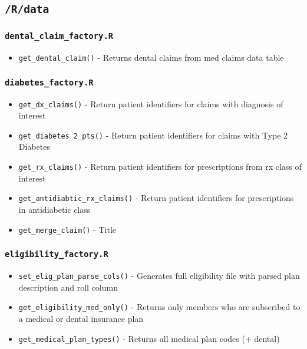 \documentclass[
]{book}
\providecommand{\tightlist}{%
  \setlength{\itemsep}{0pt}\setlength{\parskip}{0pt}}
\begin{document}
\hypertarget{rdata}{%
\subsection{\texorpdfstring{\texttt{/R/data}}{/R/data}}\label{rdata}}

\hypertarget{dental_claim_factory.r}{%
\subsubsection{\texorpdfstring{\texttt{dental\_claim\_factory.R}}{dental\_claim\_factory.R}}\label{dental_claim_factory.r}}

\begin{itemize}
\tightlist
\item
  \texttt{get\_dental\_claim()} - Returns dental claims from med claims data table
\end{itemize}

\hypertarget{diabetes_factory.r}{%
\subsubsection{\texorpdfstring{\texttt{diabetes\_factory.R}}{diabetes\_factory.R}}\label{diabetes_factory.r}}

\begin{itemize}
\tightlist
\item
  \texttt{get\_dx\_claims()} - Return patient identifiers for claims with diagnosis of interest
\item
  \texttt{get\_diabetes\_2\_pts()} - Return patient identifiers for claims with Type 2 Diabetes
\item
  \texttt{get\_rx\_claims()} - Return patient identifiers for prescriptions from rx class of interest
\item
  \texttt{get\_antidiabtic\_rx\_claims()} - Return patient identifiers for prescriptions in antidiabetic class
\item
  \texttt{get\_merge\_claim()} - Title
\end{itemize}

\hypertarget{eligibility_factory.r}{%
\subsubsection{\texorpdfstring{\texttt{eligibility\_factory.R}}{eligibility\_factory.R}}\label{eligibility_factory.r}}

\begin{itemize}
\tightlist
\item
  \texttt{set\_elig\_plan\_parse\_cols()} - Generates full eligibility file with parsed plan description and roll column
\item
  \texttt{get\_eligibility\_med\_only()} - Returns only members who are subscribed to a medical or dental insurance plan
\item
  \texttt{get\_medical\_plan\_types()} - Returns all medical plan codes (+ dental)
\end{itemize}
\end{document}
